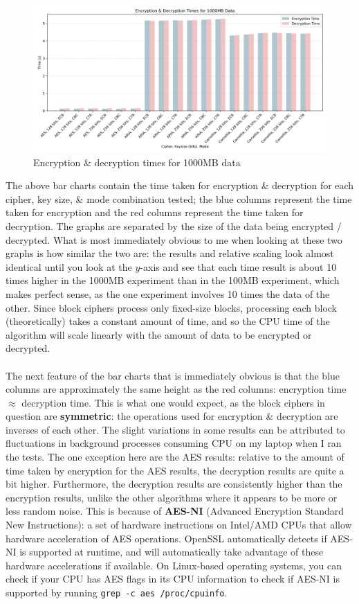 \documentclass[a4paper]{article}
\begin{document}
\begin{figure}[H]
    \centering
    \includegraphics[width=\textwidth]{./images/1000mb.png}
    \caption{Encryption \& decryption times for 1000MB data}
\end{figure}

The above bar charts contain the time taken for encryption \& decryption for each cipher, key size, \& mode combination tested;
the blue columns represent the time taken for encryption and the red columns represent the time taken for decryption.
The graphs are separated by the size of the data being encrypted / decrypted.
What is most immediately obvious to me when looking at these two graphs is how similar the two are:
the results and relative scaling look almost identical until you look at the $y$-axis and see that each time result is about 10 times higher in the 1000MB experiment than in the 100MB experiment, which makes perfect sense, as the one experiment involves 10 times the data of the other.
Since block ciphers process only fixed-size blocks, processing each block (theoretically) takes a constant amount of time, and so the CPU time of the algorithm will scale linearly with the amount of data to be encrypted or decrypted.
\\\\
The next feature of the bar charts that is immediately obvious is that the blue columns are approximately the same height as the red columns: encryption time $\approx$ decryption time.
This is what one would expect, as the block ciphers in question are \textbf{symmetric}: the operations used for encryption \& decryption are inverses of each other.
The slight variations in some results can be attributed to fluctuations in background processes consuming CPU on my laptop when I ran the tests.
The one exception here are the AES results:
relative to the amount of time taken by encryption for the AES results, the decryption results are quite a bit higher.
Furthermore, the decryption results are consistently higher than the encryption results, unlike the other algorithms where it appears to be more or less random noise.
This is because of \textbf{AES-NI} (Advanced Encryption Standard New Instructions): a set of hardware instructions on Intel/AMD CPUs that allow hardware acceleration of AES operations.
OpenSSL automatically detects if AES-NI is supported at runtime, and will automatically take advantage of these hardware accelerations if available.
On Linux-based operating systems, you can check if your CPU has AES flags in its CPU information to check if AES-NI is supported by running \texttt{grep -c aes /proc/cpuinfo}.
\end{document}
